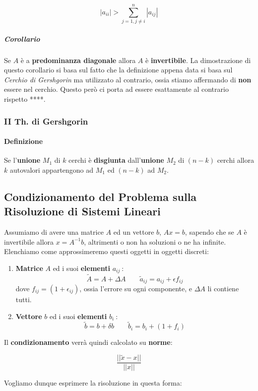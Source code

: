 \documentclass{article}
\begin{document}
\[ |a_{ii}| > \sum_{j=1,j \neq i}^{n}|a_{ij}| \]

\subparagraph{Corollario} Se $A$ è a \textbf{predominanza diagonale} allora $A$ è \textbf{invertibile}. La dimostrazione di questo corollario si basa sul fatto che la definizione appena data si basa sul \textit{Cerchio di Gershgorin} ma utilizzato al contrario, ossia stiamo affermando di \textbf{non} essere nel cerchio. Questo però ci porta ad essere esattamente al contrario rispetto ****.

\subsubsection{II Th. di Gershgorin}

\paragraph{Definizione} Se l'\textbf{unione} $M_{1}$ di $k$ cerchi è \textbf{disgiunta} dall'\textbf{unione} $M_{2}$ di $(n-k)$ cerchi allora $k$ autovalori appartengono ad $M_{1}$ ed $(n-k)$ ad $M_{2}$.

\subsection{Condizionamento del Problema sulla Risoluzione di Sistemi Lineari}

Assumiamo di avere una matrice $A$ ed un vettore $b$, $Ax = b$, sapendo che se $A$ è invertibile allora $x = A^{-1}b$, altrimenti o non ha soluzioni o ne ha infinite. Elenchiamo come approssimeremo questi oggetti in oggetti discreti:

\begin{enumerate}
    \item \textbf{Matrice} $A$ ed i suoi \textbf{elementi} $a_{ij}\:$:
    \[ \tilde{A} = A + \Delta A  \:\:\: \:\:\: \:\:\: \tilde{a}_{ij} = a_{ij} + \epsilon  f_{ij}  \]
    dove $f_{ij} = (1+\epsilon_{ij})$, ossia l'errore su ogni componente, e $\Delta A$ li contiene tutti.
    \item \textbf{Vettore} $b$ ed i suoi \textbf{elementi} $b_{i}\:$:
    \[ \tilde{b} = b + \delta b  \:\:\: \:\:\: \:\:\: \tilde{b}_{i} = b_{i} + (1+f_{i})  \]
\end{enumerate}

Il \textbf{condizionamento} verrà quindi calcolato su \textbf{norme}:

\[ \frac{||\tilde{x}-x||}{||x||} \]

Vogliamo dunque esprimere la risoluzione in questa forma:
\end{document}
